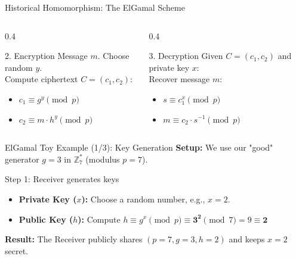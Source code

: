 \documentclass[aspectratio=169, 10pt]{beamer}
\begin{document}
\begin{frame}{Historical Homomorphism: The ElGamal Scheme}
    \vspace{0.2cm}
    \begin{columns}
        \begin{column}{0.4\textwidth}
            \begin{block}{2. Encryption}
                Message $m$. Choose random $y$.\\
                \vspace{0.1cm}
                Compute ciphertext $C = (c_1, c_2)$:
                \begin{itemize}
                    \item $c_1 \equiv g^y \pmod p$
                    \item $c_2 \equiv m \cdot h^y \pmod p$
                \end{itemize}
            \end{block}
        \end{column}
        \begin{column}{0.4\textwidth}
            \begin{block}{3. Decryption}
                Given $C = (c_1, c_2)$ and private key $x$:\\
                \vspace{0.1cm}
                Recover message $m$:
                \begin{itemize}
                    \item $s \equiv c_1^x \pmod p$
                    \item $m \equiv c_2 \cdot s^{-1} \pmod p$
                \end{itemize}
            \end{block}
        \end{column}
    \end{columns}
\end{frame}

\begin{frame}{ElGamal Toy Example (1/3): Key Generation}
    \textbf{Setup:} We use our "good" generator $g=3$ in $\mathbb{Z}_7^*$ (modulus $p=7$).
    
    \vspace{0.3cm}
    \begin{block}{Step 1: Receiver generates keys}
        \begin{itemize}
            \item \textbf{Private Key ($x$):} Choose a random number, e.g., $x = 2$.
            \vspace{0.2cm}
            \item \textbf{Public Key ($h$):} Compute $h \equiv g^x \pmod p \equiv \textbf{3}^{\textbf{2}} \pmod 7 = 9 \equiv \textbf{2}$
        \end{itemize}
    \end{block}
    
    \vspace{0.3cm}
    \textbf{Result:} The Receiver publicly shares $(p=7, g=3, h=2)$ and keeps $x=2$ secret.
\end{frame}
\end{document}
